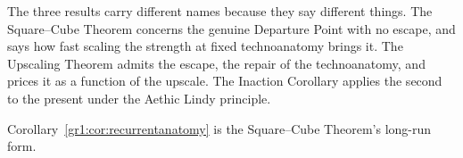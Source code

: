 \noindent The three results carry different names because they say
different things. The Square--Cube Theorem concerns the genuine Departure
Point with no escape, and says how fast scaling the strength at fixed
technoanatomy brings it. The Upscaling Theorem admits the escape, the
repair of the technoanatomy, and prices it as a function of the upscale. The
Inaction Corollary applies the second to the present under the Aethic Lindy
principle.

\noindent Corollary~\ref{gr1:cor:recurrentanatomy} is the Square--Cube
Theorem's long-run form.
